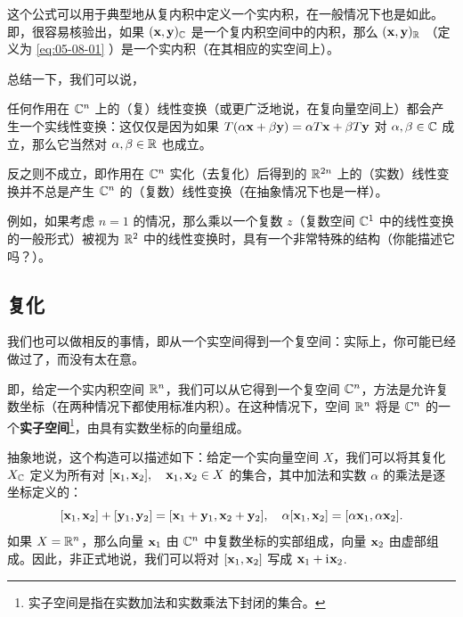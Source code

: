 这个公式可以用于典型地从复内积中定义一个实内积，在一般情况下也是如此。即，很容易核验出，如果 $(\mathbf{x}, \mathbf{y})_{\mathbb{C}}$ 是一个复内积空间中的内积，那么 $(\mathbf{x}, \mathbf{y})_{\mathbb{R}}$ （定义为 \eqref{eq:05-08-01} ）是一个实内积（在其相应的实空间上）。

总结一下，我们可以说，



\begin{remark*}
任何作用在 $\mathbb{C}^n$ 上的（复）线性变换（或更广泛地说，在复向量空间上）都会产生一个实线性变换：这仅仅是因为如果 $T(\alpha \mathbf{x} + \beta \mathbf{y}) = \alpha T \mathbf{x} + \beta T \mathbf{y}$ 对 $\alpha, \beta \in \mathbb{C}$ 成立，那么它当然对 $\alpha, \beta \in \mathbb{R}$ 也成立。
\end{remark*}

反之则不成立，即作用在 $\mathbb{C}^n$ 实化（去复化）后得到的 $\mathbb{R}^{2n}$ 上的（实数）线性变换并不总是产生 $\mathbb{C}^n$ 的（复数）线性变换（在抽象情况下也是一样）。

例如，如果考虑 $n=1$ 的情况，那么乘以一个复数 $z$（复数空间 $\mathbb{C}^1$ 中的线性变换的一般形式）被视为 $\mathbb{R}^2$ 中的线性变换时，具有一个非常特殊的结构（你能描述它吗？）。

\subsection{复化}\label{sec:05-08-02}

我们也可以做相反的事情，即从一个实空间得到一个复空间：实际上，你可能已经做过了，而没有太在意。

即，给定一个实内积空间 $\mathbb{R}^n$，我们可以从它得到一个复空间 $\mathbb{C}^n$，方法是允许复数坐标（在两种情况下都使用标准内积）。在这种情况下，空间 $\mathbb{R}^n$ 将是 $\mathbb{C}^n$ 的一个\textbf{实子空间}\footnote{
实子空间是指在实数加法和实数乘法下封闭的集合。
}，由具有实数坐标的向量组成。

抽象地说，这个构造可以描述如下：给定一个实向量空间 $X$，我们可以将其复化 $X_{\mathbb{C}}$ 定义为所有对 $[\mathbf{x}_1, \mathbf{x}_2], \quad \mathbf{x}_1, \mathbf{x}_2 \in X$ 的集合，其中加法和实数 $\alpha$ 的乘法是逐坐标定义的：
$$[\mathbf{x}_1, \mathbf{x}_2] + [\mathbf{y}_1, \mathbf{y}_2] = [\mathbf{x}_1 + \mathbf{y}_1, \mathbf{x}_2 + \mathbf{y}_2], \quad \alpha [\mathbf{x}_1, \mathbf{x}_2] = [\alpha \mathbf{x}_1, \alpha \mathbf{x}_2].$$
如果 $X = \mathbb{R}^n$，那么向量 $\mathbf{x}_1$ 由 $\mathbb{C}^n$ 中复数坐标的实部组成，向量 $\mathbf{x}_2$ 由虚部组成。因此，非正式地说，我们可以将对 $[\mathbf{x}_1, \mathbf{x}_2]$ 写成 $\mathbf{x}_1 + \mathrm{i}\mkern1mu\mathbf{x}_2$.~

